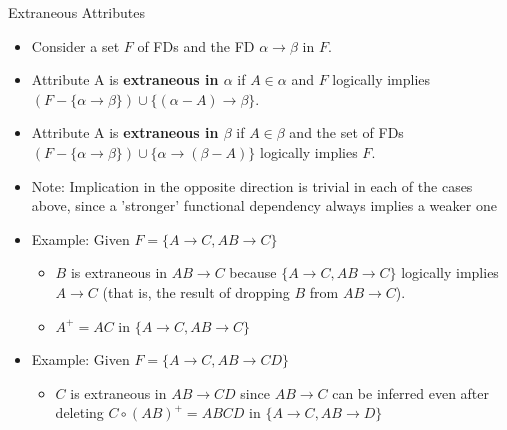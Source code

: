\documentclass[aspectratio=169, xcolor=dvipsnames]{beamer}
\begin{document}
\begin{frame}{Extraneous Attributes}
    \begin{itemize}[<+->]
        \item Consider a set $F$ of FDs and the FD $\alpha \rightarrow \beta$ in $F$.
        \item Attribute A is \textbf{extraneous in $\alpha$} if $A \in \alpha$ and $F$ logically implies $(F - \{\alpha \rightarrow \beta\}) \cup \{(\alpha - A) \rightarrow \beta\}$.
        \item Attribute A is \textbf{extraneous in $\beta$} if $A \in \beta$ and the set of FDs $(F - \{\alpha \rightarrow \beta\}) \cup \{\alpha \rightarrow (\beta - A)\}$ logically implies $F$.
        \item Note: Implication in the opposite direction is trivial in each of the cases above, since a 'stronger' functional dependency always implies a weaker one
        \item Example: Given $F = \{A \rightarrow C, AB \rightarrow C\}$
        \begin{itemize}
            \item[$\triangleright$] $B$ is extraneous in $AB \rightarrow C$ because $\{A \rightarrow C, AB \rightarrow C\}$ logically implies $A \rightarrow C$ (that is, the result of dropping $B$ from $AB \rightarrow C$).
            \item[$\triangleright$] $A^+ = AC$ in $\{A \rightarrow C, AB \rightarrow C\}$
        \end{itemize}
        \item Example: Given $F = \{A \rightarrow C, AB \rightarrow CD\}$
        \begin{itemize}
            \item[$\triangleright$] $C$ is extraneous in $AB \rightarrow CD$ since $AB \rightarrow C$ can be inferred even after deleting $C \circ (AB)^+ = ABCD$ in $\{A \rightarrow C, AB \rightarrow D\}$
        \end{itemize}
    \end{itemize}
\end{frame}
\end{document}
